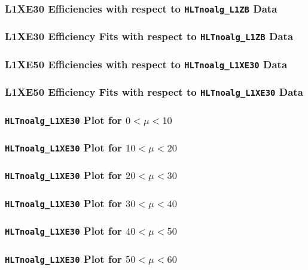 \documentclass[]{beamer}
\begin{document}
\begin{frame}
        \frametitle{L1XE30 Efficiencies with respect to \texttt{HLTnoalg\_L1ZB} Data}
\end{frame}
\begin{frame}
        \frametitle{L1XE30 Efficiency Fits with respect to \texttt{HLTnoalg\_L1ZB} Data}
\end{frame}
\begin{frame}
        \frametitle{L1XE50 Efficiencies with respect to \texttt{HLTnoalg\_L1XE30} Data}
\end{frame}
\begin{frame}
        \frametitle{L1XE50 Efficiency Fits with respect to \texttt{HLTnoalg\_L1XE30} Data}
\end{frame}
\begin{frame}
        \frametitle{\texttt{HLTnoalg\_L1XE30} Plot for $0<\mu<10$}
\end{frame}
\begin{frame}
        \frametitle{\texttt{HLTnoalg\_L1XE30} Plot for $10<\mu<20$}
\end{frame}
\begin{frame}
        \frametitle{\texttt{HLTnoalg\_L1XE30} Plot for $20<\mu<30$}
\end{frame}
\begin{frame}
        \frametitle{\texttt{HLTnoalg\_L1XE30} Plot for $30<\mu<40$}
\end{frame}
\begin{frame}
        \frametitle{\texttt{HLTnoalg\_L1XE30} Plot for $40<\mu<50$}
\end{frame}
\begin{frame}
        \frametitle{\texttt{HLTnoalg\_L1XE30} Plot for $50<\mu<60$}
\end{frame}
\end{document}

